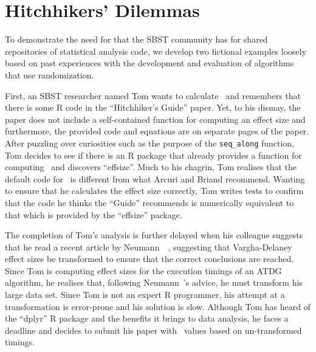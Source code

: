 
\vspace*{-1em}

\section{Hitchhikers' Dilemmas}
\label{sec:dilemma}

To demonstrate the need for that the SBST community has for shared repositories of statistical analysis code, we develop
two fictional examples loosely based on past experiences with the development and evaluation of algorithms that use
randomization.

First, an SBST researcher named Tom wants to calculate \atwelve~and remembers that there is some R code in the
``Hitchhiker's Guide'' paper. Yet, to his dismay, the paper does not include a self-contained function for computing an
effect size and furthermore, the provided code and equations are on separate pages of the paper. After puzzling over
curiosities such as the purpose of the {\tt seq\_along} function, Tom decides to see if there is an R package that
already provides a function for computing \atwelve~and discovers ``effsize''. Much to his chagrin, Tom realises that the
default code for \atwelve~is different from what Arcuri and Briand recommend. Wanting to ensure that he calculates the
effect size correctly, Tom writes tests to confirm that the code he thinks the ``Guide'' recommends is numerically
equivalent to that which is provided by the ``effsize'' package.

The completion of Tom's analysis is further delayed when his colleague suggests that he read a recent article by
Neumann~\etal~\cite{Neumann2015}, suggesting that Vargha-Delaney effect sizes be transformed to ensure that the correct
conclusions are reached. Since Tom is computing effect sizes for the execution timings of an ATDG algorithm, he realises
that, following Neumann~\etal's advice, he must transform his large data set. Since Tom is not an expert R programmer,
his attempt at a transformation is error-prone and his solution is slow. Although Tom has heard of the ``dplyr''
R package and the benefits it brings to data analysis, he faces a deadline and decides to submit his paper with
\atwelve~values based on un-transformed timings.

